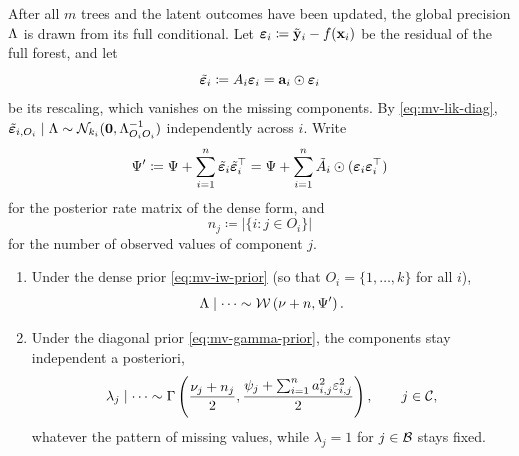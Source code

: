 After all $m$ trees and the latent outcomes have been updated, the global
precision $\Lambda$ is drawn from its full conditional. Let
$\bm{\varepsilon}_i \coloneqq \tilde{\mathbf{y}}_i - f(\mathbf{x}_i)$ be the residual of the full
forest, and let
\begin{equation}
	\label{eq:mv-eps-tilde}
	\tilde{\bm{\varepsilon}}_i \coloneqq A_i \bm{\varepsilon}_i
	= \mathbf{a}_i \odot \bm{\varepsilon}_i
\end{equation}
be its rescaling, which vanishes on the missing components. By
\eqref{eq:mv-lik-diag},
$\tilde{\bm{\varepsilon}}_{i,O_i} \mid \Lambda \sim \mathcal{N}_{k_i}(\mathbf{0}, \Lambda_{O_iO_i}^{-1})$
independently across $i$. Write
\begin{equation}
	\label{eq:mv-Sigma-rate}
	\Psi' \coloneqq \Psi + \sum_{i=1}^n \tilde{\bm{\varepsilon}}_i \tilde{\bm{\varepsilon}}_i^\top
	= \Psi + \sum_{i=1}^n \tilde{A}_i \odot (\bm{\varepsilon}_i \bm{\varepsilon}_i^\top)
\end{equation}
for the posterior rate matrix of the dense form, and
\begin{equation}
	\label{eq:mv-nj}
	n_j \coloneqq |\{i : j \in O_i\}|
\end{equation}
for the number of observed values of component $j$.

\begin{prop}
	\label{prop:mv-Sigma}
	\begin{enumerate}[label=(\roman*)]
		\item Under the dense prior \eqref{eq:mv-iw-prior} (so that
		      $O_i = \{1,\dots,k\}$ for all $i$),
		      \begin{equation}
			      \label{eq:mv-Sigma-fc}
			      \Lambda \mid \cdots \sim \mathcal{W}\left(\nu + n, \Psi'\right).
		      \end{equation}
		\item Under the diagonal prior \eqref{eq:mv-gamma-prior}, the
		      components stay independent a posteriori,
		      \begin{equation}
			      \label{eq:mv-Sigma-fc-diag}
			      \lambda_j \mid \cdots \sim
			      \Gamma\left(\frac{\nu_j + n_j}{2},
			      \frac{\psi_j + \sum_{i=1}^n a_{i,j}^2 \varepsilon_{i,j}^2}{2}\right),
			      \qquad j \in \mathcal{C},
		      \end{equation}
		      whatever the pattern of missing values, while $\lambda_j = 1$
		      for $j \in \mathcal{B}$ stays fixed.
	\end{enumerate}
\end{prop}

